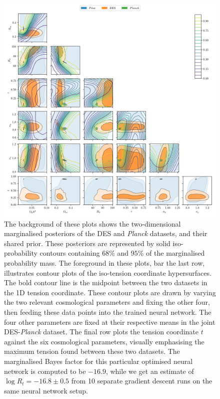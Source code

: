 \documentclass[%
 reprint,
 amsmath,amssymb,
 aps,
]{revtex4-2}
\begin{document}
\begin{figure}
    \includegraphics[width=\textwidth]{../plots/six.png}
    \centering
    \caption{The background of these plots shows the two-dimensional marginalised posteriors of the DES and \textit{Planck} datasets, and their shared prior. These posteriors are represented by solid iso-probability contours containing $68\%$ and $95\%$ of the marginalised probability mass. The foreground in these plots, bar the last row, illustrates contour plots of the iso-tension coordinate hypersurfaces. The bold contour line is the midpoint between the two datasets in the 1D tension coordinate. These contour plots are drawn by varying the two relevant cosmological parameters and fixing the other four, then feeding these data points into the trained neural network. The four other parameters are fixed at their respective means in the joint DES-\textit{Planck} dataset. The final row plots the tension coordinate $t$ against the six cosmological parameters, visually emphasising the maximum tension found between these two datasets. The marginalised Bayes factor for this particular optimised neural network is computed to be $-16.9$, while we get an estimate of $\log R_t = -16.8 \pm 0.5$ from 10 separate gradient descent runs on the same neural network setup.}
    \label{fig:six}
\end{figure}
\end{document}
